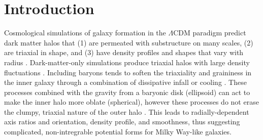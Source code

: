 \documentclass[letterpaper,12pt,preprint]{aastex}
\begin{document}

\section{Introduction}

Cosmological simulations of galaxy formation in the $\Lambda$CDM paradigm predict dark matter halos that (1) are permeated with substructure on many scales, (2) are triaxial in shape, and (3) have density profiles and shapes that vary with radius \citep{dubinski91, jing02, kuhlen07, veraciro11}. Dark-matter-only simulations produce triaxial halos \citep{jing02} with large density fluctuations \citep{zemp09}. Including baryons tends to soften the triaxiality and graininess in the inner galaxy through a combination of dissipative infall \citep{dubinski94} or cooling \citep{bryan13}. These processes combined with the gravity from a baryonic disk (ellipsoid) can act to make the inner halo more oblate (spherical), however these processes do not erase the clumpy, triaxial nature of the outer halo \citep[e.g.,][]{pontzen12}. This leads to radially-dependent axis ratios and orientation, density profile, and smoothness, thus suggesting complicated, non-intregrable potential forms for Milky Way-like galaxies.
\end{document}
